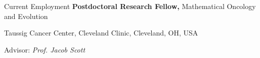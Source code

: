 \begin{rubric}{Current Employment}
%
	\textbf{Postdoctoral Research Fellow,} Mathematical Oncology and Evolution \par Taussig Cancer Center, Cleveland Clinic, Cleveland, OH, USA
 \par Advisor: \emph{Prof. Jacob Scott}
%
%
\end{rubric}